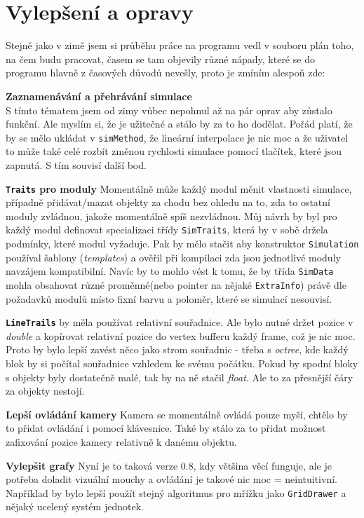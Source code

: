 \section{Vylepšení a opravy}
Stejně jako v zimě jsem si průběhu práce na programu vedl v souboru plán toho, na čem budu pracovat, časem
se tam objevily různé nápady, které se do programu hlavně z časových důvodů nevešly, proto
je zmíním alespoň zde:
\begin{description}
	\item \textbf{Zaznamenávání a přehrávání simulace} \\
	S tímto tématem jsem od zimy vůbec nepohnul až na pár oprav aby zůstalo funkční. Ale myslím si, že je užitečné a stálo by za to ho dodělat. Pořád platí, že by se mělo ukládat v \texttt{simMethod}, že lineární interpolace je nic moc a že uživatel to může také celé rozbít změnou rychlosti simulace pomocí tlačítek, které jsou zapnutá. S tím souvisí další bod.
	\item \textbf{\texttt{Traits} pro moduly}
	Momentálně může každý modul měnit vlastnosti simulace, případně přidávat/mazat objekty za chodu bez ohledu na to, zda to ostatní moduly zvládnou, jakože momentálně spíš nezvládnou. Můj návrh by byl pro každý modul definovat specializaci třídy \texttt{SimTraits}, která by v sobě držela podmínky, které modul vyžaduje. Pak by mělo stačit aby konstruktor \texttt{Simulation} používal šablony (\textit{templates}) a ověřil při kompilaci zda jsou jednotlivé moduly navzájem kompatibilní.
	Navíc by to mohlo vést k tomu, že by třída \texttt{SimData} mohla obsahovat různé proměnné(nebo pointer na nějaké \texttt
	{ExtraInfo}) právě dle požadavků modulů místo fixní barvu a poloměr, které se simulací nesouvisí.
	\item \textbf{\texttt{LineTrails}} by měla používat relativní souřadnice. Ale bylo nutné držet pozice v \textit{double} a kopírovat relativní pozice do vertex bufferu každý frame, což je nic moc. Proto by bylo lepší zavést něco jako strom souřadnic - třeba s \textit{octree}, kde každý blok by si počítal souřadnice vzhledem ke svému počátku. Pokud by spodní bloky s objekty byly dostatečně malé, tak by na ně stačil \textit{float}. Ale to za přesnější čáry za objekty nestojí.
	\item \textbf{Lepší ovládání kamery} Kamera se momentálně ovládá pouze myší, chtělo by to přidat ovládání i pomocí klávesnice. Také by stálo za to přidat možnost zafixování pozice kamery relativně k danému objektu. 
	\item \textbf{Vylepšit grafy} Nyní je to taková verze 0.8, kdy většina věcí funguje, ale je potřeba doladit vizuální mouchy a ovládání je takové nic moc = neintuitivní. Například by bylo lepší použít stejný algoritmus pro mřížku jako \texttt{GridDrawer} a nějaký ucelený systém jednotek.

\end{description}
